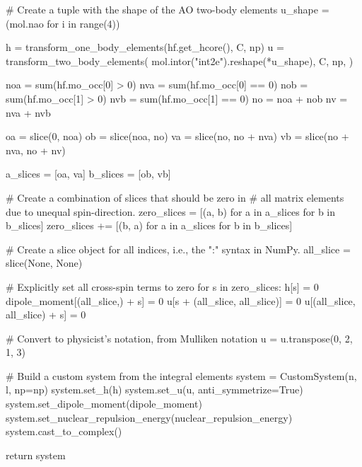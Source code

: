 \begin{python}
    # Create a tuple with the shape of the AO two-body elements
    u_shape = (mol.nao for i in range(4))

    h = transform_one_body_elements(hf.get_hcore(), C, np)
    u = transform_two_body_elements(
        mol.intor("int2e").reshape(*u_shape),
        C,
        np,
    )

    noa = sum(hf.mo_occ[0] > 0)
    nva = sum(hf.mo_occ[0] == 0)
    nob = sum(hf.mo_occ[1] > 0)
    nvb = sum(hf.mo_occ[1] == 0)
    no = noa + nob
    nv = nva + nvb

    oa = slice(0, noa)
    ob = slice(noa, no)
    va = slice(no, no + nva)
    vb = slice(no + nva, no + nv)

    a_slices = [oa, va]
    b_slices = [ob, vb]

    # Create a combination of slices that should be zero in
    # all matrix elements due to unequal spin-direction.
    zero_slices = [(a, b) for a in a_slices for b in b_slices]
    zero_slices += [(b, a) for a in a_slices for b in b_slices]

    # Create a slice object for all indices, i.e., the ":" syntax in NumPy.
    all_slice = slice(None, None)

    # Explicitly set all cross-spin terms to zero
    for s in zero_slices:
        h[s] = 0
        dipole_moment[(all_slice,) + s] = 0
        u[s + (all_slice, all_slice)] = 0
        u[(all_slice, all_slice) + s] = 0

    # Convert to physicist's notation, from Mulliken notation
    u = u.transpose(0, 2, 1, 3)

    # Build a custom system from the integral elements
    system = CustomSystem(n, l, np=np)
    system.set_h(h)
    system.set_u(u, anti_symmetrize=True)
    system.set_dipole_moment(dipole_moment)
    system.set_nuclear_repulsion_energy(nuclear_repulsion_energy)
    system.cast_to_complex()

    return system
\end{python}